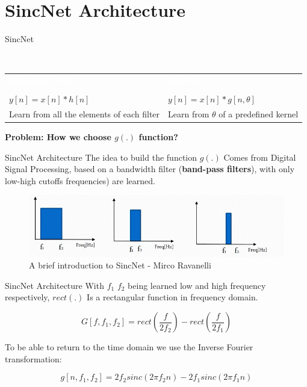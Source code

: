 \documentclass[11pt]{beamer}
\begin{document}
\section{SincNet Architecture}
\begin{frame}{SincNet}
	\begin{block}{~\vspace{0.7cm}}
		\begin{center}
			\vspace{-0.8cm}
			\begin{tabular}{p{0.45\textwidth}|p{}}
				\textcolor{white}{\bf Standard CNN} & \textcolor{white}{\bf SincNet} \\\\
				$y[n] = x[n] * h[n]$ & $y[n] = x[n] * g[n, \theta]$\\
				Learn from all the elements of each filter & Learn from $\theta$ of a predefined kernel\\
			\end{tabular}
		\end{center}
	\end{block}
	\textbf{Problem: How we choose $g(.)$ function?}
\end{frame}
\begin{frame}{SincNet Architecture}
	The idea to build the function $g (.)$ Comes from Digital Signal Processing, based on a bandwidth filter (\textbf{band-pass filters}), with only low-high cutoffs frequencies) are learned.
	\begin{figure}[H]
		\includegraphics[width=0.9\linewidth]{images/band_passfilters.png}
		\caption{A brief introduction to SincNet - Mirco Ravanelli}
		\label{fig:writing-thesis}
	\end{figure}
\end{frame}
\begin{frame}{SincNet Architecture}
	With $ f_1 $ $ f_2 $ being learned low and high frequency respectively, $ rect (.) $ Is a rectangular function in frequency domain.
	
	$$G[f, f_1, f_2] = rect\left(\frac{f}{2f_2}\right) -  rect\left(\frac{f}{2f_1}\right)$$
	
	To be able to return to the time domain we use the Inverse Fourier transformation:
	
	$$g[n, f_1, f_2] = 2f_2sinc(2\pi f_2 n) - 2f_1sinc(2\pi f_1 n)$$ 
\end{frame}
\end{document}
